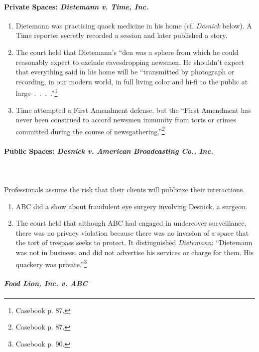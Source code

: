 \paragraph{Private Spaces: \emph{Dietemann v. Time, Inc.}}

\begin{enumerate}
    \item Dietemann was practicing quack medicine in his home (cf.  
    \emph{Desnick} below). A Time reporter secretly recorded a session and later 
    published a story.
    \item The court held that Dietemann's ``den was a sphere from which he could 
    reasonably expect to exclude eavesdropping newsmen. He shouldn't expect that 
    everything said in his home will be ``transmitted by photograph or 
    recording, in our modern world, in full living color and hi-fi to the public 
    at large~.~.~.~.''\footnote{Casebook p. 87.}
    \item Time attempted a First Amendment defense, but the ``First Amendment 
    has never been construed to accord newsmen immunity from torts or crimes 
    committed during the course of newsgathering.''\footnote{Casebook p. 87.}
\end{enumerate}

\paragraph{Public Spaces: \emph{Desnick v. American Broadcasting Co., Inc.}}
~\\\\
Professionals assume the risk that their clients will publicize their interactions.

\begin{enumerate}
    \item ABC did a show about fraudulent eye surgery involving Desnick, a 
    surgeon.
    \item The court held that although ABC had engaged in undercover 
    surveillance, there was no privacy violation because there was no invasion 
    of a space that the tort of trespass seeks to protect. It distinguished 
    \emph{Dietemann}: ``Dietemann was not in business, and did not advertise his 
    services or charge for them. His quackery was private.''\footnote{Casebook 
    p. 90.}
\end{enumerate}

\paragraph{\emph{Food Lion, Inc. v. ABC}}

